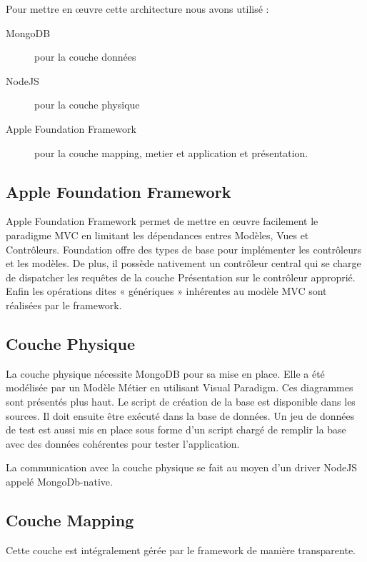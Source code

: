 \documentclass[a4paper,12pt]{report}
\begin{document}
\begin{onehalfspace}
Pour mettre en œuvre cette architecture nous avons utilisé :
\begin{description}
  \item[MongoDB] pour la couche données
  \item[NodeJS] pour la couche physique
  \item[Apple Foundation Framework] pour la couche mapping, metier et application et présentation.
\end{description}

\subsection{Apple Foundation Framework}
  Apple Foundation Framework permet de mettre en œuvre facilement le paradigme MVC en limitant les dépendances entres Modèles, Vues et Contrôleurs. Foundation offre des types de base pour implémenter les contrôleurs et les modèles. De plus, il possède nativement un contrôleur central qui se charge de dispatcher les requêtes de la couche Présentation sur le contrôleur approprié. Enfin les opérations dites « génériques » inhérentes au modèle MVC sont réalisées par le framework.

\subsection{Couche Physique}
  La couche physique nécessite MongoDB pour sa mise en place. Elle a été modélisée par un Modèle Métier en utilisant Visual Paradigm. Ces diagrammes sont présentés plus haut. Le script de création de la base est disponible dans les sources. Il doit ensuite être exécuté dans la base de données. Un jeu de données de test est aussi mis en place sous forme d’un script chargé de remplir la base avec des données cohérentes pour tester l’application.
  
  La communication avec la couche physique se fait au moyen d’un driver NodeJS appelé MongoDb-native.

\subsection{Couche Mapping}
Cette couche est intégralement gérée par le framework de manière transparente.


\end{onehalfspace}
\end{document}
